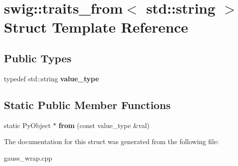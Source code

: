 \hypertarget{structswig_1_1traits__from_3_01std_1_1string_01_4}{\section{swig\-:\-:traits\-\_\-from$<$ std\-:\-:string $>$ Struct Template Reference}
\label{structswig_1_1traits__from_3_01std_1_1string_01_4}
}
\subsection*{Public Types}
\begin{DoxyCompactItemize}
\item 
\hypertarget{structswig_1_1traits__from_3_01std_1_1string_01_4_a873f8111e50ab64c5f0711f3fc8479ad}{typedef std\-::string {\bfseries value\-\_\-type}}\label{structswig_1_1traits__from_3_01std_1_1string_01_4_a873f8111e50ab64c5f0711f3fc8479ad}

\end{DoxyCompactItemize}
\subsection*{Static Public Member Functions}
\begin{DoxyCompactItemize}
\item 
\hypertarget{structswig_1_1traits__from_3_01std_1_1string_01_4_af6e0987239b6f657facf1fc5fcbddea6}{static Py\-Object $\ast$ {\bfseries from} (const value\-\_\-type \&val)}\label{structswig_1_1traits__from_3_01std_1_1string_01_4_af6e0987239b6f657facf1fc5fcbddea6}

\end{DoxyCompactItemize}


The documentation for this struct was generated from the following file\-:\begin{DoxyCompactItemize}
\item 
gauss\-\_\-wrap.\-cpp\end{DoxyCompactItemize}
